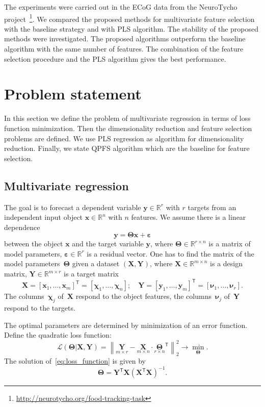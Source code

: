 \documentclass[12pt,twoside]{article}
\theoremstyle{definition}
\newcommand{\bx}{\mathbf{x}}
\newcommand{\by}{\mathbf{y}}
\newcommand{\bY}{\mathbf{Y}}
\newcommand{\bX}{\mathbf{X}}
\newcommand{\bbR}{\mathbb{R}}
\newcommand{\T}{\mathsf{T}}
\newcommand{\bchi}{\boldsymbol{\chi}}
\newcommand{\bnu}{\boldsymbol{\nu}}
\newcommand{\bTheta}{\boldsymbol{\Theta}}
\begin{document}
The experiments were carried out in the ECoG data from the NeuroTycho project~\footnote{\href{http://neurotycho.org/food-tracking-task}{http://neurotycho.org/food-tracking-task}}. 
We compared the proposed methods for multivariate feature selection with the baseline strategy and with PLS algorithm. 
The stability of the proposed methods were investigated.
The proposed algorithms outperform the baseline algorithm with the same number of features. 
The combination of the feature selection procedure and the PLS algorithm gives the best performance.

\section{Problem statement}
In this section we define the problem of multivariate regression in terms of loss function minimization. 
Then the dimensionality reduction and feature selection problems are defined. We use PLS regression as algorithm for dimensionality reduction. 
Finally, we state QPFS algorithm which are the baseline for feature selection.
\subsection{Multivariate regression}
The goal is to forecast a dependent variable $\by \in \bbR^r$ with $r$ targets from an independent input object $\bx \in \bbR^n$ with $n$ features.
We assume there is a linear dependence
\begin{equation}
\by = \bTheta \bx+ \boldsymbol{\varepsilon}
\label{eq:model}
\end{equation}
between the object $\bx$ and the target variable $\by$,
where $\bTheta \in \bbR^{r \times n}$ is a matrix of model parameters, $\boldsymbol{\varepsilon} \in \bbR^{r}$ is a residual vector.
One has to find the matrix of the model parameters~$\bTheta$ given a dataset $\left( \bX, \bY \right)$, where $\bX \in \bbR^{m \times n}$ is a design matrix, $\bY \in \bbR^{m \times r}$ is a target matrix
\begin{equation*}
\bX = [\bx_1, \dots, \bx_m]^{\T} =  [\bchi_1, \dots, \bchi_n]; \quad \bY = [\by_1, \dots, \by_m]^{\T} =  [\bnu_1, \dots, \bnu_r].
\end{equation*}
The columns~$\bchi_j$ of~$\bX$ respond to the object features, the columns~$\bnu_j$ of~$\bY$ respond to the targets.

The optimal parameters are determined by minimization of an error function.
Define the quadratic loss function:
\begin{equation}
\mathcal{L}(\bTheta | \bX, \bY) = {\left\| \underset{m \times r}{\mathbf{Y}}  - \underset{m \times n}{\bX} \cdot \underset{r \times n}{\bTheta}^{\T} \right\| }_2^2 \rightarrow\min_{\bTheta}.
\label{eq:loss_function}
\end{equation}
The solution of~\eqref{eq:loss_function} is given by
\begin{equation*}
\bTheta = \bY^{\T} \bX (\bX^{\T} \bX)^{-1}.
\end{equation*}
\end{document}
